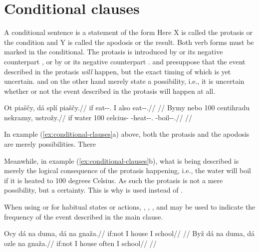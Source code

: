 \section{Conditional clauses}\label{sec:conditional-clauses}

A conditional sentence is a statement of the form  Here X is
called the protasis or the condition and Y is called the apodosis or the result.
Both verb forms must be marked in the conditional. The protasis is introduced by
 or its negative counterpart , or by
 or its negative counterpart .  and
 presuppose that the event described in the protasis \emph{will}
happen, but the exact timing of which is yet uncertain.  and 
on the other hand merely state a possibility, i.e., it is uncertain whether or
not the event described in the protasis will happen at all.

\pex\label{ex:conditional-clauses}
	\a
	\begingl
		\gla Ot piaščy, dá splí piaščy.//
		\glb if eat-\Av{}-\Cond{}.\Ipf{} I also eat-\Av{}-\Cond{}.\Ipf{}//
		\glft {}//
	\endgl
	\a
	\begingl
		\gla Bymy nebo 100 centihradu nekrazny, ustrožy.//
		\glb if water 100 celcius-\Ins{} \Caus{}-heat-\Pv{}-\Cond{}.\Ipf{} \Refl{}-boil-\Av{}-\Cond{}.\Ipf{}//
		\glft {}//
	\endgl
\xe

In example (\ref{ex:conditional-clauses}a) above, both the protasis and the apodosis are merely possibilities. There 

Meanwhile, in example (\ref{ex:conditional-clauses}b), what is being described
is merely the logical consequence of the protasis happening, i.e., the water
will boil if it is heated to 100 degrees Celsius. As such the protasis is not a
mere possibility, but a certainty. This is why  is used instead of
.

When using  or  for habitual states or actions,
, , ,
 and  may be used to indicate the frequency
of the event described in the main clause.

\pex
	\a
	\begingl
		\gla Ocy dá na duma, dá na gnaža.//
		\glb if:not I \Loc{} house I \Loc{} school//
		\glft {}//
	\endgl
	\a
	\begingl
		\gla Byž dá na duma, dá ozle na gnaža.//
		\glb if:not I \Loc{} house often I \Loc{} school//
		\glft {}//
	\endgl
\xe


